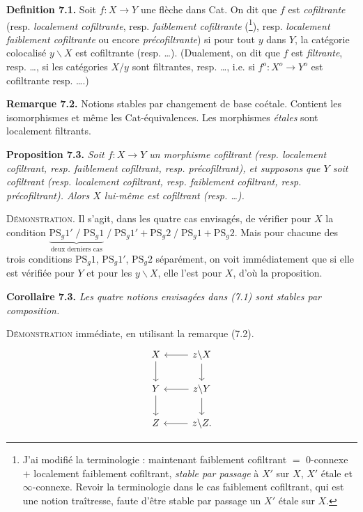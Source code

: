 \documentclass[11pt]{article}
\newcommand{\msp}[1]{\marginpar{\footnotesize [#1]}}
\begin{document}
\textbf{Definition 7.1.} Soit $f : X \longrightarrow Y$ une flèche dans Cat. On dit que $f$ est \textit{cofiltrante} (resp. \textit{localement cofiltrante}, resp. \textit{faiblement cofiltrante} (\footnote[64]{J'ai modifié la terminologie : maintenant faiblement cofiltrant $=$ 0-connexe $+$ localement faiblement cofiltrant, \textit{stable par passage} à $X'$ sur $X$, $X'$ étale et $\infty$-connexe. Revoir la terminologie dans le cas faiblement cofiltrant, qui est une notion traîtresse, faute d'être stable par passage un $X'$ étale sur $X$.}), resp. \textit{localement faiblement cofiltrante} ou encore \textit{précofiltrante}) si pour tout $y$ dans $Y$, la catégorie colocalisé $y\backslash X$ est cofiltrante (resp. \dots). (Dualement, on dit que $f$ est \textit{filtrante}, resp. \dots, si les catégories $X/y$ sont filtrantes, resp. \dots, i.e. si $f^o : X^o \longrightarrow Y^o$ est cofiltrante resp. \dots.) %

\textbf{Remarque 7.2.} Notions stables par changement de base coétale. Contient les isomorphismes et même les Cat-équivalences. Les morphismes \textit{étales} sont localement filtrants.

\textbf{Proposition 7.3.} \textit{Soit $f : X \longrightarrow Y$ un morphisme cofiltrant (resp. localement cofiltrant, resp. faiblement cofiltrant, resp. précofiltrant), et supposons que $Y$ soit cofiltrant (resp. localement cofiltrant, resp. faiblement cofiltrant, resp. précofiltrant). Alors $X$ lui-même est cofiltrant (resp. \dots).}

\textsc{Démonstration}. Il s'agit, dans les quatre cas envisagés, de vérifier pour $X$ la condition $\underbrace{\mathrm{PS}_g1' \;/\; \mathrm{PS}_g1}_{\text{deux derniers cas}} \;/\; \mathrm{PS}_g1' + \mathrm{PS}_g2 \;/\; \mathrm{PS}_g1 + \mathrm{PS}_g2$. Mais \msp{page 91} pour chacune des trois conditions $\mathrm{PS}_g1$, $\mathrm{PS}_g1'$, $\mathrm{PS}_g2$ séparément, on voit immédiatement que si elle est vérifiée pour $Y$ et pour les $y\backslash X$, elle l'est pour $X$, d'où la proposition.

\textbf{Corollaire 7.3.} \textit{Les quatre notions envisagées dans (7.1) sont stables par composition.}

\textsc{Démonstration} immédiate, en utilisant la remarque (7.2).
\[
\begin{tikzcd}
X \arrow[d] & z\backslash X \arrow[l] \arrow[d] \\
Y \arrow[d] & z\backslash Y \arrow[l] \arrow[d] \\
Z & z\backslash Z. \arrow[l]
\end{tikzcd}
\]
\end{document}
